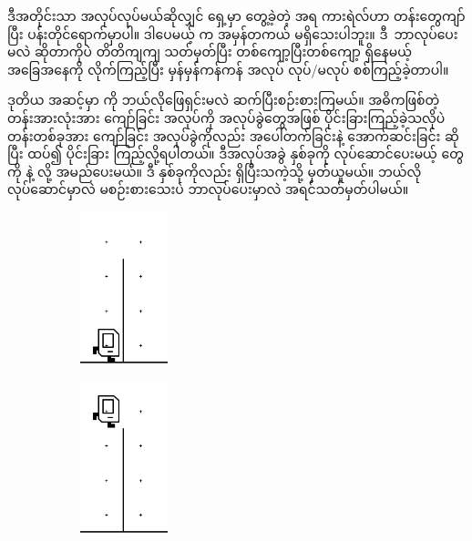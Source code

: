 \begin{sloppypar}
ဒီအတိုင်းသာ   အလုပ်လုပ်မယ်ဆိုလျှင် ရှေ့မှာ တွေ့ခဲ့တဲ့ \enForLoop အရ ကားရဲလ်ဟာ တန်းတွေကျာ်ပြီး ပန်းတိုင်ရောက်မှာပါ။ ဒါပေမယ့်  က အမှန်တကယ် မရှိသေးပါဘူး။ ဒီ\mmcommand\ ဘာလုပ်ပေးမလဲ ဆိုတာကိုပဲ တိတိကျကျ သတ်မှတ်ပြီး \enForLoop တစ်ကျော့ပြီးတစ်ကျော့ ရှိနေမယ့် အခြေအနေကို လိုက်ကြည့်ပြီး \mmprogram မှန်မှန်ကန်ကန် အလုပ် လုပ်/မလုပ် စစ်ကြည့်ခဲ့တာပါ။ 

ဒုတိယ အဆင့်မှာ  ကို ဘယ်လိုဖြေရှင်းမလဲ ဆက်ပြီးစဉ်းစားကြမယ်။ အဓိကဖြစ်တဲ့ တန်းအားလုံးအား ကျော်ခြင်း အလုပ်ကို အလုပ်ခွဲတွေအဖြစ် ပိုင်းခြားကြည့်ခဲ့သလိုပဲ တန်းတစ်ခုအား ကျော်ခြင်း အလုပ်ခွဲကိုလည်း အပေါ်တက်ခြင်းနဲ့ အောက်ဆင်းခြင်း ဆိုပြီး ထပ်၍ ပိုင်းခြား ကြည့်လို့ရပါတယ်။ ဒီအလုပ်အခွဲ နှစ်ခုကို လုပ်ဆောင်ပေးမယ့် \mmcommand တွေကို  နဲ့  လို့ အမည်ပေးမယ်။ ဒီ \mmcommand နှစ်ခုကိုလည်း ရှိပြီးသကဲ့သို့ မှတ်ယူမယ်။ ဘယ်လို လုပ်ဆောင်မှာလဲ မစဉ်းစားသေးပဲ ဘာလုပ်ပေးမှာလဲ အရင်သတ်မှတ်ပါမယ်။
\begin{figure}[!htb]
  \caption{ }
  \begin{subfigure}[t]{0.3\textwidth}
      \includegraphics[width=1in, left]{ch03/HurdleJumping/ascendPre.jpg}
      \caption{}
  \end{subfigure}
  \begin{subfigure}[t]{0.3\textwidth}
      \includegraphics[width=1in, left]{ch03/HurdleJumping/ascendPost.jpg}
      \caption{}
  \end{subfigure}
  \label{fig:ascendPreAndPost}
\end{figure}
\begin{figure}[!htb]

\end{figure}
\end{sloppypar}
